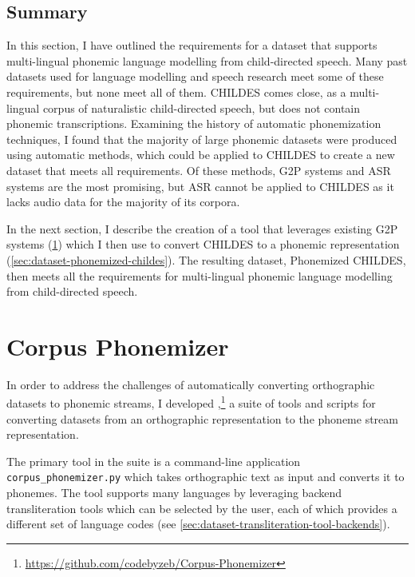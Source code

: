 \subsection{Summary}
\label{sec:dataset-background-summary}

In this section, I have outlined the requirements for a dataset that supports multi-lingual phonemic language modelling from child-directed speech. Many past datasets used for language modelling and speech research meet some of these requirements, but none meet all of them. CHILDES comes close, as a multi-lingual corpus of naturalistic child-directed speech, but does not contain phonemic transcriptions. Examining the history of automatic phonemization techniques, I found that the majority of large phonemic datasets were produced using automatic methods, which could be applied to CHILDES to create a new dataset that meets all requirements. Of these methods, G2P systems and ASR systems are the most promising, but ASR cannot be applied to CHILDES as it lacks audio data for the majority of its corpora. 

In the next section, I describe the creation of a tool that leverages existing G2P systems (\cref{sec:dataset-corpus-phonemizer}) which I then use to convert CHILDES to a phonemic representation (\cref{sec:dataset-phonemized-childes}). The resulting dataset, Phonemized CHILDES, then meets all the requirements for multi-lingual phonemic language modelling from child-directed speech. 


\section{Corpus Phonemizer}
\label{sec:dataset-corpus-phonemizer}

In order to address the challenges of automatically converting orthographic datasets to phonemic streams, I developed \corpusphonemizer,\footnote{\url{https://github.com/codebyzeb/Corpus-Phonemizer}} a suite of tools and scripts for converting datasets from an orthographic representation to the phoneme stream representation.

The primary tool in the suite is a command-line application \texttt{corpus\_phonemizer.py} which takes orthographic text as input and converts it to phonemes. The tool supports many languages by leveraging backend transliteration tools which can be selected by the user, each of which provides a different set of language codes (see \cref{sec:dataset-transliteration-tool-backends}).

